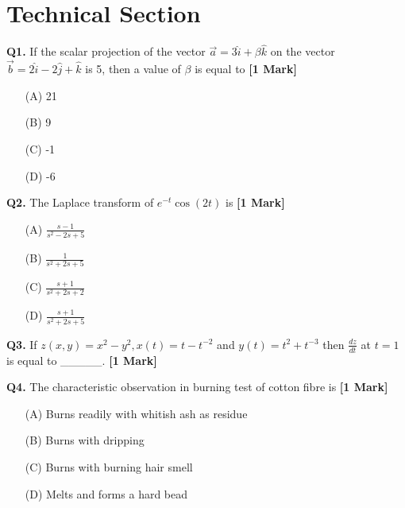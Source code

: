 \documentclass[11pt]{article}
\newcommand{\questiona}[2]{
    \noindent\textbf{Q#2.} #1 \hfill \textbf{[1 Mark]}
}
\begin{document}
\section*{Technical Section}

\questiona{If the scalar projection of the vector \( \vec{a} = 3\hat{i} + \beta \hat{k} \) on the vector \( \vec{b} = 2\hat{i} - 2\hat{j} + \hat{k} \) is 5, then a value of \( \beta \) is equal to}{1}
\begin{enumerate}
    \item[(A)] 21  
    \item[(B)] 9  
    \item[(C)] -1  
    \item[(D)] -6  
\end{enumerate}
\vspace{0.5cm}

\questiona{The Laplace transform of \( e^{-t} \cos (2t) \) is}{2}
\begin{enumerate}
    \item[(A)] \( \frac{s-1}{s^2 - 2s + 5} \)  
    \item[(B)] \( \frac{1}{s^2 + 2s + 5} \)  
    \item[(C)] \( \frac{s+1}{s^2 + 2s + 2} \)  
    \item[(D)] \( \frac{s+1}{s^2 + 2s + 5} \)  
\end{enumerate}
\vspace{0.5cm}

\questiona{If \( z(x, y) = x^2 - y^2, x(t) = t - t^{-2} \) and \( y(t) = t^2 + t^{-3} \) then \( \frac{dz}{dt} \) at \( t = 1 \) is equal to \_\_\_\_\_.}{3}
\vspace{0.5cm}

\questiona{The characteristic observation in burning test of cotton fibre is}{4}
\begin{enumerate}
    \item[(A)] Burns readily with whitish ash as residue  
    \item[(B)] Burns with dripping  
    \item[(C)] Burns with burning hair smell  
    \item[(D)] Melts and forms a hard bead  
\end{enumerate}
\vspace{0.5cm}
\end{document}
